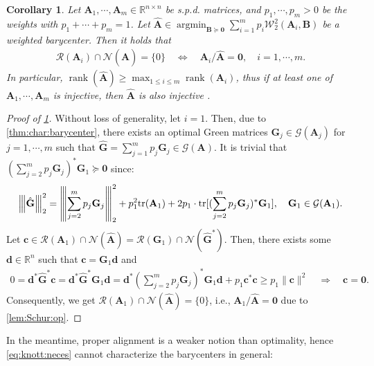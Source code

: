 \documentclass[noinfoline]{imsart}\setcounter{tocdepth}{2}
\renewcommand{\b}[1]{\mathbb{#1}} %
\newcommand{\m}[1]{\mathbf{#1}} %
\renewcommand{\c}[1]{\mathcal{#1}} %
\DeclareMathOperator*{\rk}{rank}
\DeclareMathOperator*{\argmin}{\arg\min}
\newcommand{\vertiii}[1]{{\left\vert\kern-0.25ex\left\vert\kern-0.25ex\left\vert #1 
    \right\vert\kern-0.25ex\right\vert\kern-0.25ex\right\vert}} %
\theoremstyle{plain}
\newtheorem{corollary}[theorem]{Corollary}
\begin{document}
\begin{corollary}\label{cor:bary:injec}
Let $\m{A}_{1}, \cdots, \m{A}_{m}  \in \b{R}^{n \times n}$ be s.p.d. matrices, and $p_{1}, \cdots, p_{m} > 0$ be the weights with $p_{1} + \cdots + p_{m} = 1$. Let $\hat{\m{A}} \in \argmin_{\m{B} \succeq \m{0}}  \sum_{i=1}^{m} p_{i} \c{W}_{2}^{2}(\m{A}_{i}, \m{B})$ be a weighted barycenter. Then it holds that
\begin{align*}
    \c{R} (\m{A}_{i}) \cap \c{N}(\hat{\m{A}}) = \{0\} \quad \Leftrightarrow \quad \m{A}_{i}/\hat{\m{A}} = \m{0}, \quad i = 1, \cdots, m.
\end{align*}
In particular, $\rk(\hat{\m{A}}) \ge \max_{1 \le i \le m} \rk(\m{A}_{i})$, thus if at least one of $\m{A}_{1}, \cdots, \m{A}_{m}$ is injective, then $\hat{\m{A}}$ is also injective \cite{agueh2011barycenters}.
\end{corollary}
\begin{proof}[Proof of \cref{cor:bary:injec}]
Without loss of generality, let $i = 1$. Then,
due to \cref{thm:char:barycenter}, there exists an optimal Green matrices $\m{G}_{j} \in \c{G}(\m{A}_{j})$ for $j=1, \cdots, m$ such that $\hat{\m{G}} = \sum_{j=1}^{m} p_{j} \m{G}_{j} \in \c{G}(\m{A})$. It is trivial that $(\sum_{j=2}^{m} p_{j} \m{G}_{j} )^{*} \m{G}_{1} \succeq \m{0}$ since:
\begin{align*}
    \vertiii{\hat{\m{G}}}_{2}^{2} = \vertiii{\sum_{j=2}^{m} p_{j} \m{G}_{j} }_{2}^{2} + p_{1}^{2} \text{tr}(\m{A}_{1}) + 2 p_{1} \cdot \text{tr} [(\sum_{j=2}^{m} p_{j} \m{G}_{j} )^{*} \m{G}_{1}], \quad \m{G}_{1} \in \c{G}(\m{A}_{1}).
\end{align*}
Let $\m{c} \in \c{R} (\m{A}_{1}) \cap \c{N}(\hat{\m{A}}) = \c{R}(\m{G}_{1}) \cap \c{N}(\hat{\m{G}}^{*})$. Then, there exists some $\m{d} \in \b{R}^{n}$ such that $\m{c} = \m{G}_{1} \m{d}$ and
\begin{align*}
    0 = \m{d}^{*} \hat{\m{G}}^{*} \m{c} = \m{d}^{*} \hat{\m{G}}^{*} \m{G}_{1} \m{d} = \m{d}^{*} \left(\sum_{j=2}^{m} p_{j} \m{G}_{j} \right)^{*} \m{G}_{1} \m{d} + p_{1} \m{c}^{*} \m{c} \ge p_{1} \|\m{c}\|^{2} \quad \Rightarrow \quad \m{c} = \m{0}.
\end{align*}
Consequently, we get $\c{R} (\m{A}_{1}) \cap \c{N}(\hat{\m{A}}) = \{0\}$, i.e., $\m{A}_{1}/\hat{\m{A}} = \m{0}$ due to \cref{lem:Schur:op}.
\end{proof}


In the meantime, proper alignment is a weaker notion than optimality, hence \eqref{eq:knott:neces} cannot characterize the barycenters in general:
\end{document}
